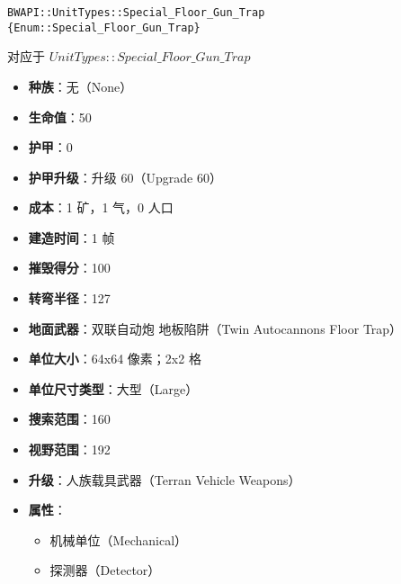 \begin{tcolorbox}[colback=white, colframe=black!60!white, title=Special\_Floor\_Gun\_Trap(), arc=0mm]
    \begin{verbatim}
BWAPI::UnitTypes::Special_Floor_Gun_Trap {Enum::Special_Floor_Gun_Trap}
    \end{verbatim}
    对应于  $UnitTypes::Special\_Floor\_Gun\_Trap$ 
    \begin{itemize}
        \item \textbf{种族}：无（None）
        \item \textbf{生命值}：50
        \item \textbf{护甲}：0
        \item \textbf{护甲升级}：升级 60（Upgrade 60）
        \item \textbf{成本}：1 矿，1 气，0 人口
        \item \textbf{建造时间}：1 帧
        \item \textbf{摧毁得分}：100
        \item \textbf{转弯半径}：127
        \item \textbf{地面武器}：双联自动炮 地板陷阱（Twin Autocannons Floor Trap）
        \item \textbf{单位大小}：64x64 像素；2x2 格
        \item \textbf{单位尺寸类型}：大型（Large）
        \item \textbf{搜索范围}：160
        \item \textbf{视野范围}：192
        \item \textbf{升级}：人族载具武器（Terran Vehicle Weapons）
        \item \textbf{属性}：
            \begin{itemize}
                \item 机械单位（Mechanical）
                \item 探测器（Detector）
            \end{itemize}
    \end{itemize}
\end{tcolorbox}

